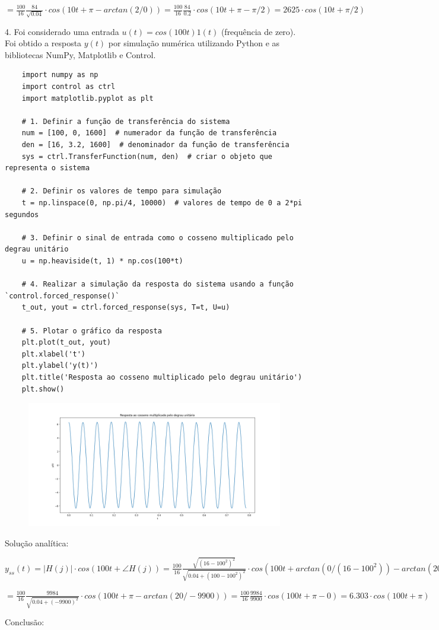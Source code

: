 \documentclass[10pt]{article}
\begin{document}
$= \frac{100}{16} \frac{84}{\sqrt{0.04}} \cdot cos(10 t + \pi - arctan(2/0)) = \frac{100}{16} \frac{84}{0.2} \cdot cos(10 t + \pi - \pi/2) = 2625 \cdot cos(10 t + \pi/2)$

4. Foi considerado uma entrada $u(t) = cos(100 t) 1(t)$ (frequência de zero). Foi obtido a resposta $y(t)$ por simulação numérica utilizando Python
e as bibliotecas NumPy, Matplotlib e Control.

\begin{verbatim}
    import numpy as np
    import control as ctrl
    import matplotlib.pyplot as plt

    # 1. Definir a função de transferência do sistema
    num = [100, 0, 1600]  # numerador da função de transferência
    den = [16, 3.2, 1600]  # denominador da função de transferência
    sys = ctrl.TransferFunction(num, den)  # criar o objeto que representa o sistema

    # 2. Definir os valores de tempo para simulação
    t = np.linspace(0, np.pi/4, 10000)  # valores de tempo de 0 a 2*pi segundos

    # 3. Definir o sinal de entrada como o cosseno multiplicado pelo degrau unitário
    u = np.heaviside(t, 1) * np.cos(100*t)

    # 4. Realizar a simulação da resposta do sistema usando a função `control.forced_response()`
    t_out, yout = ctrl.forced_response(sys, T=t, U=u)

    # 5. Plotar o gráfico da resposta
    plt.plot(t_out, yout)
    plt.xlabel('t')
    plt.ylabel('y(t)')
    plt.title('Resposta ao cosseno multiplicado pelo degrau unitário')
    plt.show()
\end{verbatim}

\begin{figure}[h]
    \includegraphics[scale=0.4]{questao4.png}
    \centering
\end{figure}

Solução analítica:

$y_{ss}(t) = |H(j)| \cdot cos(100 t + \angle H(j)) = \frac{100}{16} \frac{\sqrt{(16-100^2)^2}}{\sqrt{0.04 + (100 - 100^2)^2}} \cdot cos(100 t + arctan(0/(16 - 100^2)) - arctan(20/(100 - 100^2))) =$

$= \frac{100}{16} \frac{9984}{\sqrt{0.04 + (-9900)^2}} \cdot cos(100 t + \pi - arctan(20/-9900)) = \frac{100}{16} \frac{9984}{9900} \cdot cos(100 t + \pi - 0) = 6.303 \cdot cos(100 t + \pi)$

Conclusão:
\end{document}
